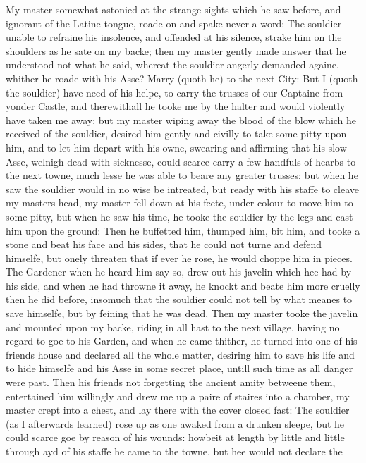 My master somewhat astonied at the strange sights which he saw before, and
ignorant of the Latine tongue, roade on and spake never a word: The souldier
unable to refraine his insolence, and offended at his silence, strake him on
the shoulders as he sate on my backe; then my master gently made answer that he
understood not what he said, whereat the souldier angerly demanded againe,
whither he roade with his Asse? Marry (quoth he) to the next City: But I (quoth
the souldier) have need of his helpe, to carry the trusses of our Captaine from
yonder Castle, and therewithall he tooke me by the halter and would violently
have taken me away: but my master wiping away the blood of the blow which he
received of the souldier, desired him gently and civilly to take some pitty
upon him, and to let him depart with his owne, swearing and affirming that his
slow Asse, welnigh dead with sicknesse, could scarce carry a few handfuls of
hearbs to the next towne, much lesse he was able to beare any greater trusses:
but when he saw the souldier would in no wise be intreated, but ready with his
staffe to cleave my masters head, my master fell down at his feete, under
colour to move him to some pitty, but when he saw his time, he tooke the
souldier by the legs and cast him upon the ground: Then he buffetted him,
thumped him, bit him, and tooke a stone and beat his face and his sides, that
he could not turne and defend himselfe, but onely threaten that if ever he
rose, he would choppe him in pieces. The Gardener when he heard him say so,
drew out his javelin which hee had by his side, and when he had throwne it
away, he knockt and beate him more cruelly then he did before, insomuch that
the souldier could not tell by what meanes to save himselfe, but by feining
that he was dead, Then my master tooke the javelin and mounted upon my backe,
riding in all hast to the next village, having no regard to goe to his Garden,
and when he came thither, he turned into one of his friends house and declared
all the whole matter, desiring him to save his life and to hide himselfe and
his Asse in some secret place, untill such time as all danger were past. Then
his friends not forgetting the ancient amity betweene them, entertained him
willingly and drew me up a paire of staires into a chamber, my master crept
into a chest, and lay there with the cover closed fast: The souldier (as I
afterwards learned) rose up as one awaked from a drunken sleepe, but he could
scarce goe by reason of his wounds: howbeit at length by little and little
through ayd of his staffe he came to the towne, but hee would not declare the
